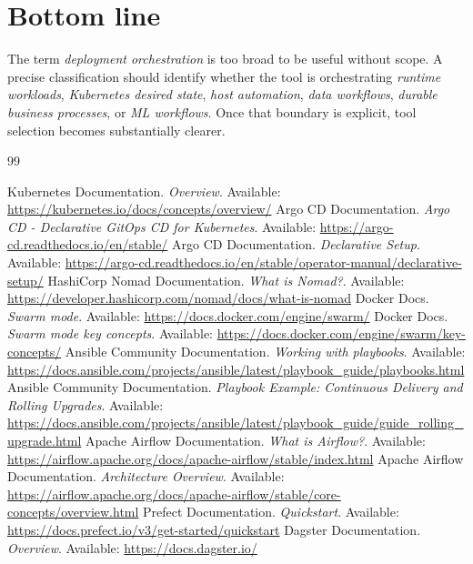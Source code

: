 \documentclass[11pt]{article}
\begin{document}
\section{Bottom line}
The term \emph{deployment orchestration} is too broad to be useful without scope. A precise classification should identify whether the tool is orchestrating \emph{runtime workloads}, \emph{Kubernetes desired state}, \emph{host automation}, \emph{data workflows}, \emph{durable business processes}, or \emph{ML workflows}. Once that boundary is explicit, tool selection becomes substantially clearer.\cite{KubernetesOverview,ArgoCDHome,AnsiblePlaybooks,AirflowHome,TemporalWhatIs,KubeflowIntro}

\begin{thebibliography}{99}
\raggedright
{} Kubernetes Documentation. \emph{Overview}. Available: \url{https://kubernetes.io/docs/concepts/overview/}
 Argo CD Documentation. \emph{Argo CD - Declarative GitOps CD for Kubernetes}. Available: \url{https://argo-cd.readthedocs.io/en/stable/}
 Argo CD Documentation. \emph{Declarative Setup}. Available: \url{https://argo-cd.readthedocs.io/en/stable/operator-manual/declarative-setup/}
 HashiCorp Nomad Documentation. \emph{What is Nomad?}. Available: \url{https://developer.hashicorp.com/nomad/docs/what-is-nomad}
 Docker Docs. \emph{Swarm mode}. Available: \url{https://docs.docker.com/engine/swarm/}
 Docker Docs. \emph{Swarm mode key concepts}. Available: \url{https://docs.docker.com/engine/swarm/key-concepts/}
 Ansible Community Documentation. \emph{Working with playbooks}. Available: \url{https://docs.ansible.com/projects/ansible/latest/playbook_guide/playbooks.html}
 Ansible Community Documentation. \emph{Playbook Example: Continuous Delivery and Rolling Upgrades}. Available: \url{https://docs.ansible.com/projects/ansible/latest/playbook_guide/guide_rolling_upgrade.html}
 Apache Airflow Documentation. \emph{What is Airflow?}. Available: \url{https://airflow.apache.org/docs/apache-airflow/stable/index.html}
 Apache Airflow Documentation. \emph{Architecture Overview}. Available: \url{https://airflow.apache.org/docs/apache-airflow/stable/core-concepts/overview.html}
 Prefect Documentation. \emph{Quickstart}. Available: \url{https://docs.prefect.io/v3/get-started/quickstart}
 Dagster Documentation. \emph{Overview}. Available: \url{https://docs.dagster.io/}

\end{thebibliography}
\end{document}
